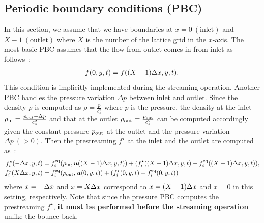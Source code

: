 \subsection{Periodic boundary conditions (PBC)}
In this section, we assume that we have
boundaries at $x = 0~(\text{inlet})$ and $X - 1~(\text{outlet})$
where $X$ is the number of the lattice grid in the $x$-axis.
The most basic PBC assumes that
the flow from outlet comes in from inlet as follows~\cite{succi2018lattice}: 
\begin{equation}
\begin{aligned}
  f(0, y, t) = f((X - 1)\Delta x, y, t).
\end{aligned}
\end{equation}
This condition is implicitly implemented during the streaming operation.
Another PBC handles
the pressure variation $\Delta p$ between inlet and outlet.
Since the density $\rho$ is computed as $\rho = \frac{p}{c_s^2}$
where $p$ is the pressure,
the density at the inlet $\rho_{\rm in} = \frac{p_{\rm out} + \Delta p }{c_s^2}$ and
that at the outlet $\rho_{\rm out} = \frac{p_{\rm out}}{c_s^2}$ can be computed
accordingly given the constant pressure $p_{\rm out}$
at the outlet and the pressure variation $\Delta p ~(> 0)$.
Then the prestreaming $f^\star$ at 
the inlet and the outlet are computed as~\cite{succi2018lattice}:
\begin{equation}
\begin{aligned}
  f_i^\star(-\Delta x, y, t) &=
  f_i^{\rm eq}(\rho_{\rm in}, \boldsymbol{u}((X - 1)\Delta x, y, t))
  + (f_i^\star((X - 1)\Delta x, y, t) - f_i^{\rm eq}((X - 1)\Delta x, y, t)), \\
  f_i^\star(X\Delta x, y, t) &=
  f_i^{\rm eq}(\rho_{\rm out}, \boldsymbol{u}(0, y, t))
  + (f_i^\star(0, y, t) - f_i^{\rm eq}(0, y, t))\\
\end{aligned}
\label{discretized-pbc-pressure}
\end{equation}
where $x = -\Delta x$ and $x = X\Delta x$ correspond to $x = (X - 1)\Delta x$ and $x = 0$ in this setting,
respectively.
Note that since the pressure PBC computes the prestreaming $f^\star$,
{\bf it must be performed before the streaming operation} unlike the bounce-back.
